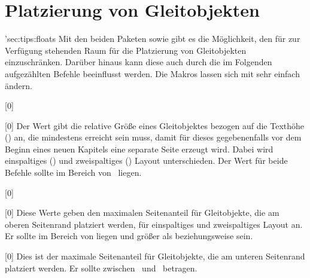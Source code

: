 \section{Platzierung von Gleitobjekten}
\manualhyperdef'{sec:tips:floats}{}%
%
%
Mit den beiden Paketen  sowie  gibt es die 
Möglichkeit, den für  zur Verfügung stehenden Raum für die 
Platzierung von Gleitobjekten einzuschränken. Darüber hinaus kann diese auch 
durch die im Folgenden aufgezählten Befehle beeinflusst werden. Die Makros 
lassen sich mit  sehr 
einfach ändern.

\begin{Declaration}{}[0\floatpagefraction]
\begin{Declaration}{}[0\dblfloatpagefraction]
\printdeclarationlist*%
%
Der Wert gibt die relative Größe eines Gleitobjektes bezogen auf die Texthöhe 
() an, die mindestens erreicht sein muss, damit für dieses 
gegebenenfalls vor dem Beginn eines neuen Kapitels eine separate Seite erzeugt 
wird. Dabei wird einspaltiges () und zweispaltiges 
() Layout unterschieden. Der Wert für beide 
Befehle sollte im Bereich von~ liegen.
\end{Declaration}
\end{Declaration}

\begin{Declaration}{}[0\topfraction]
\begin{Declaration}{}[0\dbltopfraction]
\printdeclarationlist*%
%
Diese Werte geben den maximalen Seitenanteil für Gleitobjekte, die am oberen 
Seitenrand platziert werden, für einspaltiges und zweispaltiges Layout an. Er 
sollte im Bereich von  liegen und größer als 
 beziehungsweise  sein.
\end{Declaration}
\end{Declaration}

\begin{Declaration}{}[0\bottomfraction]
\printdeclarationlist*%
%
Dies ist der maximale Seitenanteil für Gleitobjekte, die am unteren Seitenrand 
platziert werden. Er sollte zwischen~ und~ betragen.
\end{Declaration}

